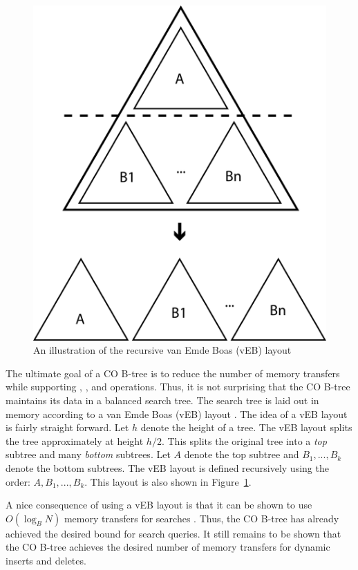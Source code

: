 \documentclass[preprint]{style}
\begin{document}
\begin{figure}

\begin{center}
	\includegraphics[width=0.8\columnwidth]{figures/veb.pdf}
\end{center}

\caption{An illustration of the recursive van Emde Boas (vEB) layout}
\label{fig:veb}
\end{figure}

The ultimate goal of a CO B-tree is to reduce the number of memory transfers
while supporting \Search{}, \Insert{}, and \Delete{} operations. Thus, it is
not surprising that the CO B-tree maintains its data in a balanced search tree.
The search tree is laid out in memory according to a van Emde Boas (vEB) layout
\cite{veb1,veb2}. The idea of a vEB layout is fairly straight forward. Let $h$
denote the height of a tree. The vEB layout splits the tree approximately at
height $h/2$. This splits the original tree into a \textit{top} subtree and
many \textit{bottom} subtrees.  Let $A$ denote the top subtree and
$B_1,...,B_k$ denote the bottom subtrees.  The vEB layout is defined
recursively using the order: $A,B_1,...,B_k$. This layout is also shown in
Figure~\ref{fig:veb}.

A nice consequence of using a vEB layout is that it can be shown to use
$O(\log_{B}{N})$ memory transfers for searches \cite{veb1, veb2}. Thus, the CO
B-tree has already achieved the desired bound for search queries. It still
remains to be shown that the CO B-tree achieves the desired number of memory
transfers for dynamic inserts and deletes.
\end{document}

